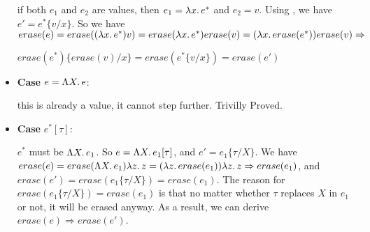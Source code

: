 \documentclass[10pt]{article}
\begin{document}
\begin{exercise}
\begin{itemize}
	if both $e_1$ and $e_2$ are values, then $e_1 = \lambda x.\,e^*$ and $e_2 = v$. Using ,
	we have $e' = e^*\{v/x\}$. So we have $erase(e) = erase((\lambda x.\,e^*)v) = erase(\lambda x.\,e^*)erase(v) =
	(\lambda x.\,erase(e^*))erase(v) \Rightarrow$ 
	
	$erase(e^*)\{erase(v)/x\} = erase(e^*\{v/x\}) = erase(e') $
	\item \textbf{Case} $e = \Lambda X.\,e$:

	this is already a value, it cannot step further. Trivilly Proved.
	\item \textbf{Case} $e^*[\tau]$:

	$e^*$ must be $\Lambda X.\,e_1$. So $e = \Lambda X.\,e_1[\tau]$, and $e' = e_1\{\tau/X\}$.
	We have $erase(e) = erase(\Lambda X.\,e_1)\lambda z.\,z = (\lambda z.\,erase(e_1))\lambda z.\,z \Rightarrow erase(e_1)$,
	and $erase(e') = erase(e_1\{\tau/X\}) = erase(e_1)$. The reason for $erase(e_1\{\tau/X\}) = erase(e_1)$ is that
	no matter whether $\tau$ replaces $X$ in $e_1$ or not, it will be erased anyway. As a result, we can derive
	$erase(e) \Rightarrow erase(e')$.
\end{itemize}
\end{exercise}
\end{document}
